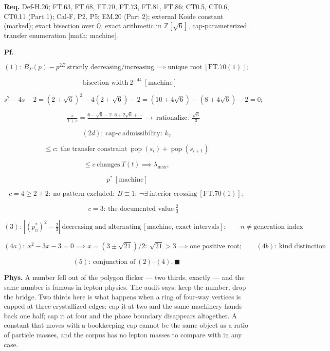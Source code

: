 \documentclass[11pt,openany]{report}
\theoremstyle{canonplain}
\theoremstyle{canondef}
\begin{document}
\textbf{Req.} Def-H.26; FT.63, FT.68, FT.70, FT.73, FT.81, FT.86; CT0.5, CT0.6, CT0.11 (Part 1); Cal-F, P2, P5; EM.20 (Part 2); external Koide constant (marked); exact bisection over $\mathbb Q$, exact arithmetic in $\mathbb Z[\sqrt6]$, cap-parameterized transfer enumeration [math; machine].

\textbf{Pf.}

\[
(1):\ B_\Gamma(p)-p^{2E}\ \text{strictly decreasing/increasing}\implies\text{unique root}\ [\mathrm{FT.70}(1)];
\]

\[
\quad\text{bisection width}\ 2^{-44}\ [\text{machine}]
\]

\[
s^2-4s-2=(2+\sqrt6)^2-4(2+\sqrt6)-2=(10+4\sqrt6)-(8+4\sqrt6)-2=0;
\]

\[
\qquad \tfrac{s}{1+s}=\tfrac{6-\sqrt6-2\cdot 6+2\sqrt6+\cdots}{}\ \to\ \text{rationalize}:\ \tfrac{\sqrt6}{3}
\]

\[
(2d):\ \text{cap-}c\ \text{admissibility}:\ k_v
\]

\[
\le c:\ \text{the transfer constraint}\ \operatorname{pop}(s_i)+\operatorname{pop}(s_{i+1})
\]

\[
\le c\ \text{changes}\ T(t)\implies\lambda_{\max},
\]

\[
\ p^*\ [\text{machine}]
\]

\[
c=4\ge2+2:\ \text{no pattern excluded}:\ B\equiv1:\ \neg\exists\ \text{interior crossing}\ [\mathrm{FT.70}(1)];
\]

\[
\qquad c=3:\ \text{the documented value}\ \tfrac23
\]

\[
(3):\ |(p^*_n)^2-\tfrac23|\ \text{decreasing and alternating}\ [\text{machine, exact intervals}];\qquad n\ne\text{generation index}
\]

\[
(4a):\ x^2-3x-3=0\implies x=(3\pm\sqrt{21})/2:\ \sqrt{21}>3\implies\text{one positive root};\qquad(4b):\ \text{kind distinction}
\]

\[
(5):\ \text{conjunction of}\ (2)\text{–}(4).\ \blacksquare
\]

\textbf{Phys.} A number fell out of the polygon flicker — two thirds, exactly — and the same number is famous in lepton physics. The audit says: keep the number, drop the bridge. Two thirds here is what happens when a ring of four-way vertices is capped at three crystallized edges; cap it at two and the same machinery hands back one half; cap it at four and the phase boundary disappears altogether. A constant that moves with a bookkeeping cap cannot be the same object as a ratio of particle masses, and the corpus has no lepton masses to compare with in any case.
\end{document}
